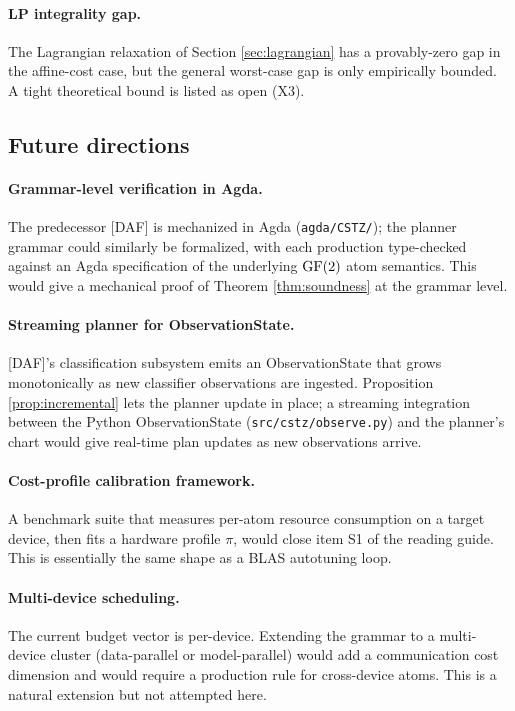 \paragraph{LP integrality gap.} The Lagrangian
relaxation of Section \ref{sec:lagrangian} has a
provably-zero gap in the affine-cost case, but the
general worst-case gap is only empirically bounded.
A tight theoretical bound is listed as open (X3).

\subsection{Future directions}

\paragraph{Grammar-level verification in Agda.}
The predecessor [DAF] is mechanized in Agda
(\texttt{agda/CSTZ/}); the planner grammar
could similarly be formalized, with each
production type-checked against an Agda
specification of the underlying $\operatorname{GF}(2)$ atom
semantics. This would give a mechanical proof
of Theorem \ref{thm:soundness} at the grammar
level.

\paragraph{Streaming planner for ObservationState.}
[DAF]'s classification subsystem emits an
ObservationState that grows monotonically as
new classifier observations are ingested.
Proposition \ref{prop:incremental} lets the
planner update in place; a streaming integration
between the Python ObservationState
(\texttt{src/cstz/observe.py}) and the planner's
chart would give real-time plan updates as new
observations arrive.

\paragraph{Cost-profile calibration framework.}
A benchmark suite that measures per-atom resource
consumption on a target device, then fits a
hardware profile $\pi$, would close item S1 of
the reading guide. This is essentially the same
shape as a BLAS autotuning loop.

\paragraph{Multi-device scheduling.} The current
budget vector is per-device. Extending the grammar
to a multi-device cluster (data-parallel or
model-parallel) would add a communication cost
dimension and would require a production rule for
cross-device atoms. This is a natural extension
but not attempted here.

